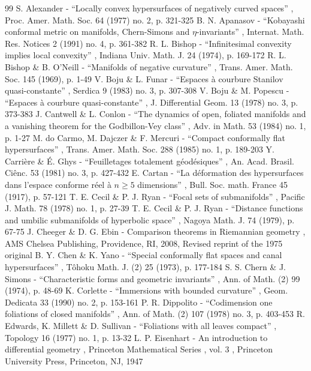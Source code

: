 \documentclass[10pt]{amsart}
\theoremstyle{definition}
\theoremstyle{remark}
\numberwithin{equation}{section}
\begin{document}
\begin{thebibliography}{99}
 S. Alexander - “Locally convex hypersurfaces of negatively curved spaces” , Proc. Amer. Math. Soc. 64 (1977) no. 2, p. 321-325
 B. N. Apanasov - “Kobayashi conformal metric on manifolds, Chern-Simons and $\eta $-invariants” , Internat. Math. Res. Notices 2 (1991) no. 4, p. 361-382
 R. L. Bishop - “Infinitesimal convexity implies local convexity” , Indiana Univ. Math. J. 24 (1974), p. 169-172
 R. L. Bishop \& B. O’Neill - “Manifolds of negative curvature” , Trans. Amer. Math. Soc. 145 (1969), p. 1-49
 V. Boju \& L. Funar - “Espaces à courbure Stanilov quasi-constante” , Serdica 9 (1983) no. 3, p. 307-308
 V. Boju \& M. Popescu - “Espaces à courbure quasi-constante” , J. Differential Geom. 13 (1978) no. 3, p. 373-383
 J. Cantwell \& L. Conlon - “The dynamics of open, foliated manifolds and a vanishing theorem for the Godbillon-Vey class” , Adv. in Math. 53 (1984) no. 1, p. 1-27
 M. do Carmo, M. Dajczer \& F. Mercuri - “Compact conformally flat hypersurfaces” , Trans. Amer. Math. Soc. 288 (1985) no. 1, p. 189-203
 Y. Carrière \& É. Ghys - “Feuilletages totalement géodésiques” , An. Acad. Brasil. Ciênc. 53 (1981) no. 3, p. 427-432
 E. Cartan - “La déformation des hypersurfaces dans l’espace conforme réel à $n \ge 5$ dimensions” , Bull. Soc. math. France 45 (1917), p. 57-121
 T. E. Cecil \& P. J. Ryan - “Focal sets of submanifolds” , Pacific J. Math. 78 (1978) no. 1, p. 27-39
 T. E. Cecil \& P. J. Ryan - “Distance functions and umbilic submanifolds of hyperbolic space” , Nagoya Math. J. 74 (1979), p. 67-75
 J. Cheeger \& D. G. Ebin - Comparison theorems in Riemannian geometry , AMS Chelsea Publishing, Providence, RI, 2008, Revised reprint of the 1975 original
 B. Y. Chen \& K. Yano - “Special conformally flat spaces and canal hypersurfaces” , Tôhoku Math. J. (2) 25 (1973), p. 177-184
 S. S. Chern \& J. Simons - “Characteristic forms and geometric invariants” , Ann. of Math. (2) 99 (1974), p. 48-69
 K. Corlette - “Immersions with bounded curvature” , Geom. Dedicata 33 (1990) no. 2, p. 153-161
 P. R. Dippolito - “Codimension one foliations of closed manifolds” , Ann. of Math. (2) 107 (1978) no. 3, p. 403-453
 R. Edwards, K. Millett \& D. Sullivan - “Foliations with all leaves compact” , Topology 16 (1977) no. 1, p. 13-32
 L. P. Eisenhart - An introduction to differential geometry , Princeton Mathematical Series , vol. 3 , Princeton University Press, Princeton, NJ, 1947

\end{thebibliography}
\end{document}
